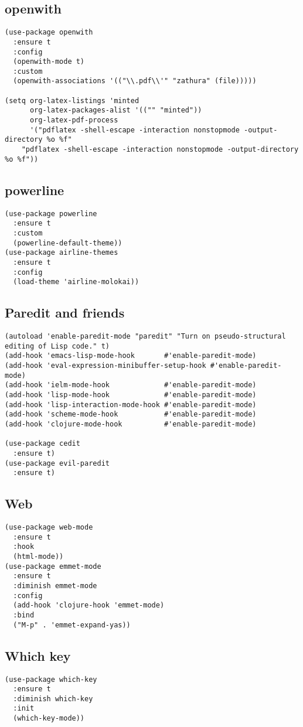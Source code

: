 \documentclass[11pt]{article}
\begin{document}
\subsection{openwith}
\label{sec-2-35}
\begin{verbatim}
(use-package openwith
  :ensure t
  :config
  (openwith-mode t)
  :custom
  (openwith-associations '(("\\.pdf\\'" "zathura" (file)))))

(setq org-latex-listings 'minted
      org-latex-packages-alist '(("" "minted"))
      org-latex-pdf-process
      '("pdflatex -shell-escape -interaction nonstopmode -output-directory %o %f"
	"pdflatex -shell-escape -interaction nonstopmode -output-directory %o %f"))
\end{verbatim}
\subsection{powerline}
\label{sec-2-36}
\begin{verbatim}
(use-package powerline
  :ensure t
  :custom
  (powerline-default-theme))
(use-package airline-themes
  :ensure t
  :config
  (load-theme 'airline-molokai))
\end{verbatim}
\subsection{Paredit and friends}
\label{sec-2-37}
\begin{verbatim}
(autoload 'enable-paredit-mode "paredit" "Turn on pseudo-structural editing of Lisp code." t)
(add-hook 'emacs-lisp-mode-hook       #'enable-paredit-mode)
(add-hook 'eval-expression-minibuffer-setup-hook #'enable-paredit-mode)
(add-hook 'ielm-mode-hook             #'enable-paredit-mode)
(add-hook 'lisp-mode-hook             #'enable-paredit-mode)
(add-hook 'lisp-interaction-mode-hook #'enable-paredit-mode)
(add-hook 'scheme-mode-hook           #'enable-paredit-mode)
(add-hook 'clojure-mode-hook          #'enable-paredit-mode)

(use-package cedit
  :ensure t)
(use-package evil-paredit
  :ensure t)
\end{verbatim}
\subsection{Web}
\label{sec-2-38}
\begin{verbatim}
(use-package web-mode
  :ensure t
  :hook
  (html-mode))
(use-package emmet-mode
  :ensure t
  :diminish emmet-mode
  :config
  (add-hook 'clojure-hook 'emmet-mode)
  :bind
  ("M-p" . 'emmet-expand-yas))
\end{verbatim}
\subsection{Which key}
\label{sec-2-39}
\begin{verbatim}
(use-package which-key
  :ensure t
  :diminish which-key
  :init
  (which-key-mode))
\end{verbatim}
\end{document}
